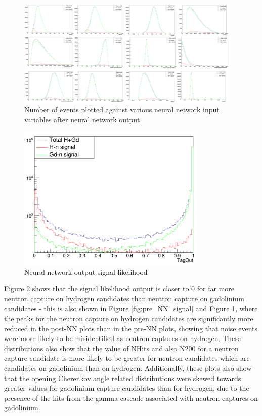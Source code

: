 \begin{figure}
    \centering
    \includegraphics[width=0.95\textwidth]{Figures/post_nn_var.png}
    \caption{Number of events plotted against various neural network input variables after neural network output }
    \label{fig:post_NN_signal}

\end{figure}

\begin{figure}
    \centering
    \includegraphics[width=0.8\textwidth]{Figures/tagout.png}
    \caption{Neural network output signal likelihood }
    \label{fig:tagout}

\end{figure}


Figure \ref{fig:tagout} shows that the signal likelihood output is closer to 0 for far more neutron capture on hydrogen candidates than neutron capture on gadolinium candidates - this is also shown in Figure \ref{fig:pre_NN_signal} and Figure \ref{fig:post_NN_signal}, where the peaks for the neutron capture on hydrogen candidates are significantly more reduced in the post-NN plots than in the pre-NN plots, showing that noise events were more likely to be misidentified as neutron captures on hydrogen. These distributions also show that the value of NHits and also N200 for a neutron capture candidate is more likely to be greater for neutron candidates which are candidates on gadolinium than on hydrogen. Additionally, these plots also show that the opening Cherenkov angle related distributions were skewed towards greater values for gadolinium capture candidates than for hydrogen, due to the presence of the hits from the gamma cascade associated with neutron captures on gadolinium. 

